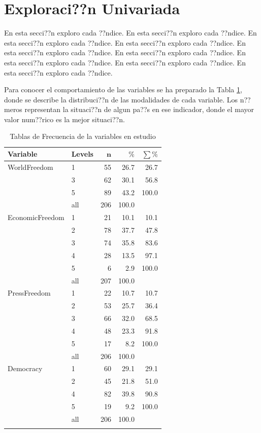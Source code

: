 \section{Exploraci??n Univariada}\label{univariada}

En esta secci??n exploro cada ??ndice. En esta secci??n exploro cada ??ndice. En esta secci??n exploro cada ??ndice. En esta secci??n exploro cada ??ndice. En esta secci??n exploro cada ??ndice. En esta secci??n exploro cada ??ndice. En esta secci??n exploro cada ??ndice. En esta secci??n exploro cada ??ndice. En esta secci??n exploro cada ??ndice.





Para conocer el comportamiento de las variables se ha preparado la Tabla \ref{Tfrecuencias}, donde se describe la distribuci??n de las modalidades de cada variable. Los n??meros representan la situaci??n de algun pa??s en ese indicador, donde el mayor valor num??rico es la mejor situaci??n.

\begingroup\normalsize
\begin{longtable}{llrrr}
\caption{Tablas de Frecuencia de la variables en estudio} \\ 
 \textbf{Variable} & \textbf{Levels} & $\mathbf{n}$ & $\mathbf{\%}$ & $\mathbf{\sum \%}$ \\ 
  \hline \hline
WorldFreedom & 1 & 55 & 26.7 & 26.7 \\ 
   & 3 & 62 & 30.1 & 56.8 \\ 
   & 5 & 89 & 43.2 & 100.0 \\ 
   \hline
 & all & 206 & 100.0 &  \\ 
   \hline
\hline
EconomicFreedom & 1 & 21 & 10.1 & 10.1 \\ 
   & 2 & 78 & 37.7 & 47.8 \\ 
   & 3 & 74 & 35.8 & 83.6 \\ 
   & 4 & 28 & 13.5 & 97.1 \\ 
   & 5 & 6 & 2.9 & 100.0 \\ 
   \hline
 & all & 207 & 100.0 &  \\ 
   \hline
\hline
PressFreedom & 1 & 22 & 10.7 & 10.7 \\ 
   & 2 & 53 & 25.7 & 36.4 \\ 
   & 3 & 66 & 32.0 & 68.5 \\ 
   & 4 & 48 & 23.3 & 91.8 \\ 
   & 5 & 17 & 8.2 & 100.0 \\ 
   \hline
 & all & 206 & 100.0 &  \\ 
   \hline
\hline
Democracy & 1 & 60 & 29.1 & 29.1 \\ 
   & 2 & 45 & 21.8 & 51.0 \\ 
   & 4 & 82 & 39.8 & 90.8 \\ 
   & 5 & 19 & 9.2 & 100.0 \\ 
   \hline
 & all & 206 & 100.0 &  \\ 
   \hline
\hline
\hline
\label{Tfrecuencias}
\end{longtable}
\endgroup

